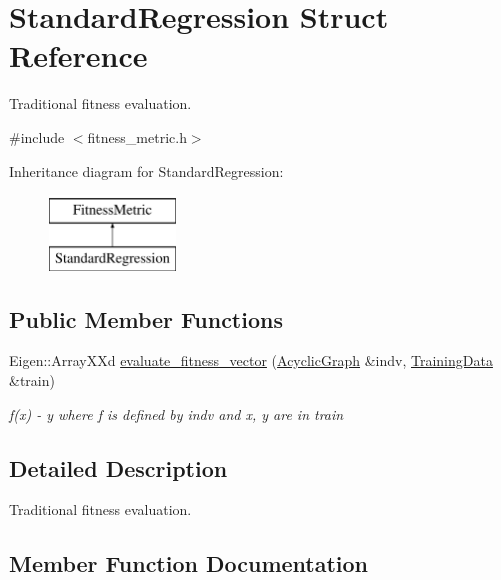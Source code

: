 \hypertarget{structStandardRegression}{}\section{Standard\+Regression Struct Reference}
\label{structStandardRegression}


Traditional fitness evaluation.  




{\ttfamily \#include $<$fitness\+\_\+metric.\+h$>$}

Inheritance diagram for Standard\+Regression\+:\begin{figure}[H]
\begin{center}
\leavevmode
\includegraphics[height=2.000000cm]{structStandardRegression}
\end{center}
\end{figure}
\subsection*{Public Member Functions}
\begin{DoxyCompactItemize}
\item 
Eigen\+::\+Array\+X\+Xd \hyperlink{structStandardRegression_a0c35e5b8ce369988c8e1d6c3249b9581}{evaluate\+\_\+fitness\+\_\+vector} (\hyperlink{classAcyclicGraph}{Acyclic\+Graph} \&indv, \hyperlink{structTrainingData}{Training\+Data} \&train)
\begin{DoxyCompactList}\small\item\em f(x) -\/ y where f is defined by indv and x, y are in train \end{DoxyCompactList}\end{DoxyCompactItemize}


\subsection{Detailed Description}
Traditional fitness evaluation. 

\subsection{Member Function Documentation}
